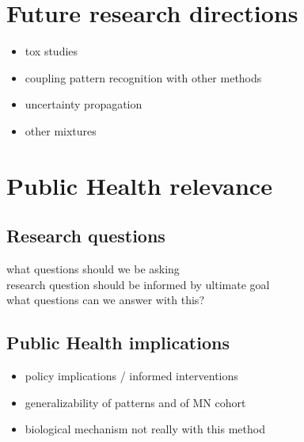 \section{Future research directions}\label{sec:future}

\begin{itemize}
    \item tox studies
    \item coupling pattern recognition with other methods
    \item uncertainty propagation
    \item other mixtures
\end{itemize}

\section{Public Health relevance}\label{sec:ph}

\subsection{Research questions}\label{sec:question}
what questions should we be asking \\
research question should be informed by ultimate goal \\
what questions can we answer with this?

\subsection{Public Health implications}\label{sec:fin}

\begin{itemize}
    \item policy implications / informed interventions
    \item generalizability of patterns and of MN cohort
    \item biological mechanism not really with this method
\end{itemize}